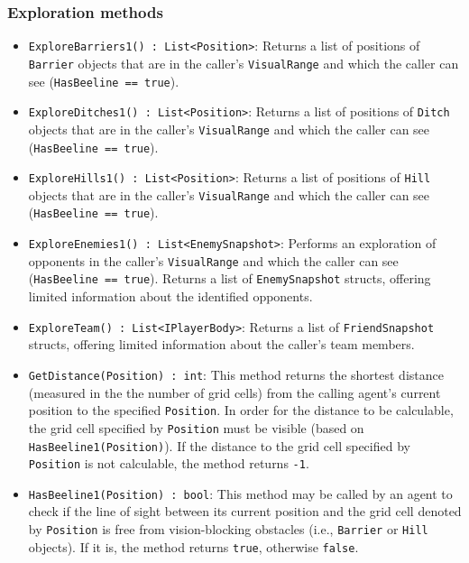 \documentclass[
  a4paper,
  english,
  DIV=16,
  11pt,
  parskip=half,
  dvipsnames,
  listof=totoc,		     %
  index=totoc,		     %
  bibliography=totoc,	 %
]{scrartcl}
\begin{document}
\subsubsection{Exploration methods} \label{sssec:explMeth}
\begin{itemize}
  \item \texttt{ExploreBarriers1() :~List<Position>}: Returns a list of positions of \texttt{Barrier} objects that are in the caller's \texttt{VisualRange} and which the caller can see (\texttt{HasBeeline == true}).
  \item \texttt{ExploreDitches1() :~List<Position>}: Returns a list of positions of \texttt{Ditch} objects that are in the caller's \texttt{VisualRange} and which the caller can see (\texttt{HasBeeline == true}).
  \item \texttt{ExploreHills1() :~List<Position>}: Returns a list of positions of \texttt{Hill} objects that are in the caller's \texttt{VisualRange} and which the caller can see (\texttt{HasBeeline == true}).
  \item \texttt{ExploreEnemies1() :~List<EnemySnapshot>}: Performs an exploration of opponents in the caller's \texttt{VisualRange} and which the caller can see (\texttt{HasBeeline == true}). Returns a list of \texttt{EnemySnapshot} structs, offering limited information about the identified opponents.
  \item \texttt{ExploreTeam() :~List<IPlayerBody>}: Returns a list of \texttt{FriendSnapshot} structs, offering limited information about the caller's team members.
  \item \texttt{GetDistance(Position) :~int}: This method returns the shortest distance (measured in the the number of grid cells) from the calling agent's current position to the specified \texttt{Position}. In order for the distance to be calculable, the grid cell specified by \texttt{Position} must be visible (based on \texttt{HasBeeline1(Position)}). If the distance to the grid cell specified by \texttt{Position} is not calculable, the method returns \texttt{-1}.
  \item \texttt{HasBeeline1(Position) :~bool}: This method may be called by an agent to check if the line of sight between its current position and the grid cell denoted by \texttt{Position} is free from vision-blocking obstacles (i.e., \texttt{Barrier} or \texttt{Hill} objects). If it is, the method returns \texttt{true}, otherwise \texttt{false}.
\end{itemize}
%
\end{document}
